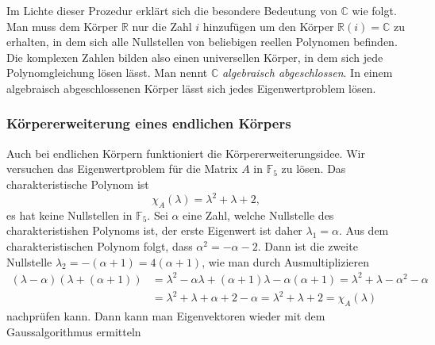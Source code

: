 Im Lichte dieser Prozedur erklärt sich die besondere Bedeutung
von $\mathbb C$ wie folgt. 
Man muss dem Körper $\mathbb R$ nur die Zahl $i$ hinzufügen um
den Körper $\mathbb R(i)=\mathbb C$ zu erhalten, in dem sich alle Nullstellen
von beliebigen reellen Polynomen befinden.
Die komplexen Zahlen bilden also einen universellen Körper, in dem
sich jede Polynomgleichung lösen lässt.
Man nennt $\mathbb C$ {\em algebraisch abgeschlossen}.
%
In einem algebraisch abgeschlossenen Körper lässt sich jedes Eigenwertproblem
lösen.

\subsubsection{Körpererweiterung eines endlichen Körpers}
Auch bei endlichen Körpern funktioniert die Körpererweiterungsidee.
Wir versuchen das Eigenwertproblem für die Matrix $A$ in $\mathbb F_5$ 
zu lösen.
Das charakteristische Polynom ist
\[
\chi_{A}(\lambda) = \lambda^2 + \lambda + 2,
\]
es hat keine Nullstellen in $\mathbb F_5$.
Sei $\alpha$ eine Zahl, welche Nullstelle des charakteristishen Polynoms ist,
der erste Eigenwert ist daher $\lambda_1=\alpha$.
Aus dem charakteristischen Polynom folgt, dass $\alpha^2=-\alpha-2$.
Dann ist die zweite Nullstelle $\lambda_2=-(\alpha+1)=4(\alpha+1)$,
wie man durch Ausmultiplizieren 
\begin{align*}
(\lambda-\alpha)(\lambda + (\alpha+1))
&=
\lambda^2 -\alpha\lambda +(\alpha+1)\lambda -\alpha(\alpha+1)
=
\lambda^2 + \lambda-\alpha^2-\alpha
\\
&=
\lambda^2 + \lambda + \alpha + 2 - \alpha
=
\lambda^2 + \lambda + 2
=
\chi_{A}(\lambda)
\end{align*}
nachprüfen kann.
Dann kann man Eigenvektoren wieder mit dem Gaussalgorithmus ermitteln

